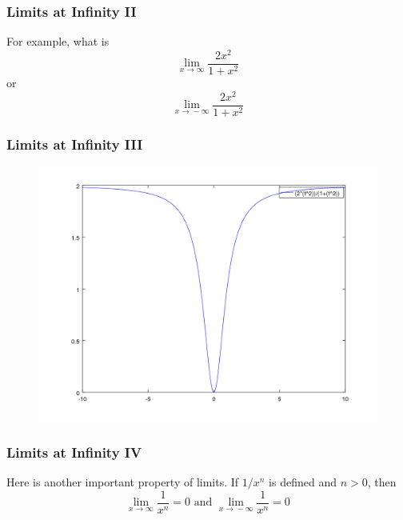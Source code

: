 \documentclass[xcolor=dvipsnames]{beamer}
\begin{document}
\begin{frame}
  \frametitle{Limits at Infinity II}
For example, what is
\begin{equation}
  \label{eq:wingeisa}
  \lim_{x\rightarrow\infty}\frac{2x^{2}}{1+x^{2}}
\end{equation}
or
\begin{equation}
  \label{eq:ahxaibah}
  \lim_{x\rightarrow{}-\infty}\frac{2x^{2}}{1+x^{2}}
\end{equation}
\end{frame}

\begin{frame}
  \frametitle{Limits at Infinity III}
  \begin{figure}[h]
    \includegraphics[scale=.5]{./diagrams/lai.png}
  \end{figure}
\end{frame}

\begin{frame}
  \frametitle{Limits at Infinity IV}
Here is another important property of limits. If $1/x^{n}$ is defined and $n>0$, then
\begin{equation}
  \label{eq:faingiej}
  \lim_{x\rightarrow{}\infty}\frac{1}{x^{n}}=0\mbox{ and }\lim_{x\rightarrow{}-\infty}\frac{1}{x^{n}}=0
\end{equation}
\end{frame}
\end{document}
